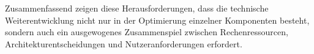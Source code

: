     Zusammenfassend zeigen diese Herausforderungen, dass die technische Weiterentwicklung nicht nur in der Optimierung einzelner Komponenten besteht, sondern auch ein ausgewogenes Zusammenspiel zwischen Rechenressourcen, Architekturentscheidungen und Nutzeranforderungen erfordert.





